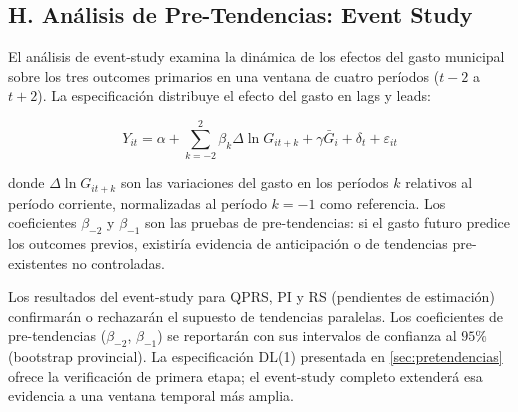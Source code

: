 \subsection*{H. Análisis de Pre-Tendencias: Event Study}
\label{sec:appendix_pretendencias}

El análisis de event-study examina la dinámica de los efectos del gasto municipal sobre los tres outcomes primarios en una ventana de cuatro períodos ($t-2$ a $t+2$).
La especificación distribuye el efecto del gasto en lags y leads:

\begin{equation}
  Y_{it} = \alpha + \sum_{k=-2}^{2} \beta_k \Delta \ln G_{it+k} + \gamma \bar{G}_{i} + \delta_{t} + \varepsilon_{it}
  \label{eq:event_study}
\end{equation}

\noindent donde $\Delta \ln G_{it+k}$ son las variaciones del gasto en los períodos $k$ relativos al período corriente, normalizadas al período $k = -1$ como referencia.
Los coeficientes $\beta_{-2}$ y $\beta_{-1}$ son las pruebas de pre-tendencias: si el gasto futuro predice los outcomes previos, existiría evidencia de anticipación o de tendencias pre-existentes no controladas.

Los resultados del event-study para QPRS, PI y RS (pendientes de estimación) confirmarán o rechazarán el supuesto de tendencias paralelas.
Los coeficientes de pre-tendencias ($\beta_{-2}$, $\beta_{-1}$) se reportarán con sus intervalos de confianza al $95\%$ (bootstrap provincial).
La especificación DL(1) presentada en \cref{sec:pretendencias} ofrece la verificación de primera etapa; el event-study completo extenderá esa evidencia a una ventana temporal más amplia.


